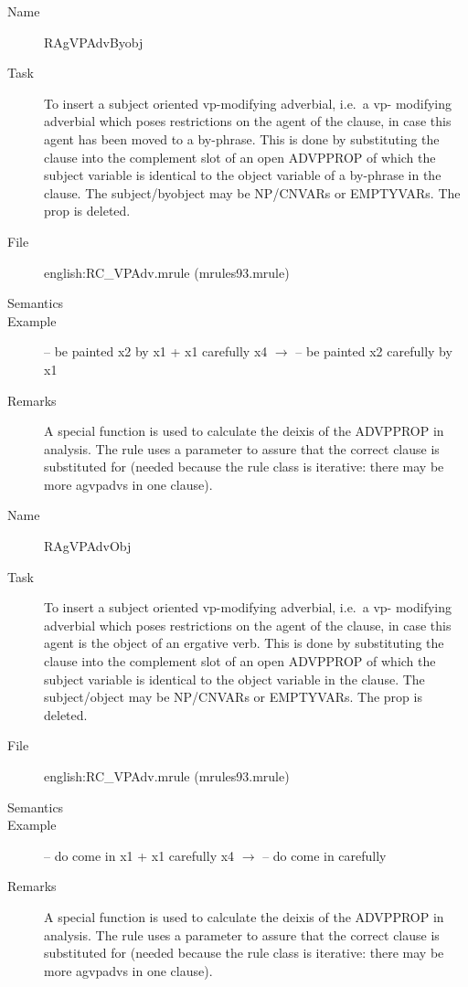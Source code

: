 \begin{description}
\vspace{1 cm}
\begin{description}
\item[Name] RAgVPAdvByobj
\item[Task] To insert a subject oriented vp-modifying adverbial, i.e.\ a vp-
modifying adverbial which poses restrictions on the agent of the clause, in 
case this agent has been moved to a by-phrase.
This is done by 
substituting the clause into the complement slot of an open ADVPPROP of which 
the subject variable is identical to the object variable of a by-phrase in 
the clause.
The subject/byobject may be NP/CNVARs or EMPTYVARs. The prop is deleted. 
\item[File] english:RC\_VPAdv.mrule (mrules93.mrule)
\item[Semantics]
\item[Example] -- be painted x2 by x1 + x1 carefully x4 $\rightarrow$ -- be 
painted x2 carefully by x1
\item[Remarks] A special function is used to calculate the deixis of the 
ADVPPROP in analysis. The rule uses a parameter to assure that the correct 
clause is substituted for (needed because the rule class is iterative: there 
may be more agvpadvs in one clause).
\end{description}

\vspace{1 cm}
\begin{description}
\item[Name]   RAgVPAdvObj
\item[Task] To insert a subject oriented vp-modifying adverbial, i.e.\ a vp-
modifying adverbial which poses restrictions on the agent of the clause, in 
case this agent is the object of an ergative verb.
This is done by 
substituting the clause into the complement slot of an open ADVPPROP of which 
the subject variable is identical to the object variable in the clause.
The subject/object may be NP/CNVARs or EMPTYVARs. The prop is deleted. 
\item[File] english:RC\_VPAdv.mrule (mrules93.mrule)
\item[Semantics]
\item[Example] -- do come in x1 + x1 carefully x4 $\rightarrow$ -- do
come in carefully 
\item[Remarks] A special function is used to calculate the deixis of the 
ADVPPROP in analysis. The rule uses a parameter to assure that the correct 
clause is substituted for (needed because the rule class is iterative: there 
may be more agvpadvs in one clause).
\end{description}

\end{description}

